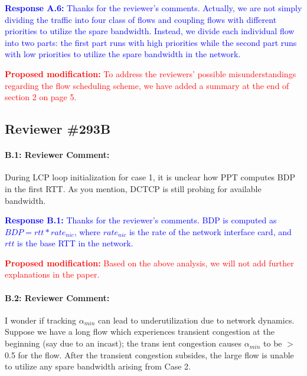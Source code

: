 \documentclass[12pt,one-column]{article}
\begin{document}
\noindent\textcolor{blue}{\textbf{Response A.6:} Thanks for the reviewer's comments. Actually, we are not simply dividing the traffic into four class of flows and coupling flows with different priorities to utilize the spare bandwidth. Instead, we divide each individual flow into two parts: the first part runs with high priorities while the second part runs with low priorities to utilize the spare bandwidth in the network.}

\noindent\textcolor{red}{\textbf{Proposed modification: }
To address the reviewers' possible misunderstandings regarding the flow scheduling scheme, we have added a summary at the end of section 2 on page 5.
}

\subsection{Reviewer \#293B}
{\it \paragraph{B.1: Reviewer Comment:} During LCP loop initialization for case 1, it is unclear how PPT computes BDP in the first RTT. As you mention, DCTCP is still probing for available bandwidth.}

\noindent\textcolor{blue}{\textbf{Response B.1:}
Thanks for the reviewer's comments. 
BDP is computed as $BDP = rtt*rate_{nic}$, where $rate_{nic}$ is the rate of the network interface card, and $rtt$ is the base RTT in the network.
}

\noindent\textcolor{red}{\textbf{Proposed modification: }
Based on the above analysis, we will not add further explanations in the paper.
}

{\it \paragraph{B.2: Reviewer Comment:} I wonder if tracking $\alpha_{min}$ can lead to underutilization due to network dynamics. Suppose we have a long flow which experiences transient congestion at the beginning (say due to an incast); the trans ient congestion causes $\alpha_{min}$ to be $>$ 0.5 for the flow. After the transient congestion subsides, the large flow is unable to utilize any spare bandwidth arising from Case 2.}
\end{document}

